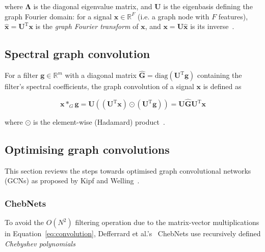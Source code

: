where $\mathbf{\Lambda}$ is the diagonal eigenvalue matrix, and $\mathbf{U}$ is the eigenbasis defining the graph Fourier domain: for a signal $\mathbf{x} \in \mathbb{R}^{F}$ (i.e. a graph node with $F$ features), $\mathbf{\hat{x}} = \mathbf{U}^\mathrm{T}\mathbf{x}$ is the \textit{graph Fourier transform} of $\mathbf{x}$, and $\mathbf{x} = \mathbf{U}\mathbf{\hat{x}}$ is its inverse~\cite{wu2019simplifying}.



\subsection{Spectral graph convolution}

For a filter $\mathbf{g} \in \mathbb{R}^m$ with a diagonal matrix $\mathbf{\hat{G}} = \mathrm{diag}(\mathbf{U}^\mathrm{T}\mathbf{g})$ containing the filter's spectral coefficients, the graph convolution of a signal $\mathbf{x}$ is defined as

\begin{equation}
    \label{eq:convolution}
    \mathbf{x} *_G \mathbf{g} = \mathbf{U}((\mathbf{U}^\mathrm{T}\mathbf{x}) \odot (\mathbf{U}^\mathrm{T}\mathbf{g})) = \mathbf{U}\mathbf{\hat{G}}\mathbf{U}^\mathrm{T}\mathbf{x}
\end{equation}

where $\odot$ is the element-wise (Hadamard) product~\cite{wu2019simplifying}.

\subsection{Optimising graph convolutions}
This section reviews the steps towards optimised graph convolutional networks (GCNs) as proposed by Kipf and Welling~\cite{kipf2017semi}.

\subsubsection{ChebNets}
To avoid the $O(N^2)$ filtering operation due to the matrix-vector multiplications in Equation~\eqref{eq:convolution}, Defferrard et al.'s~\cite{defferrard2016convolutional} ChebNets use recursively defined \textit{Chebyshev polynomials}

